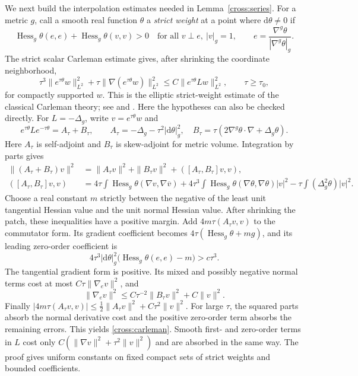 \documentclass[11pt]{article}
\theoremstyle{definition}
\theoremstyle{remark}
\newcommand{\dd}{\mathrm d}
\numberwithin{equation}{section}
\begin{document}
We next build the interpolation estimates needed in
Lemma~\ref{cross:series}.  For a metric $g$, call a smooth real function
$\theta$ a \emph{strict weight} at a point where $\dd\theta\ne0$ if
\begin{equation}\label{cross:strict-weight}
 \operatorname{Hess}_g\theta(e,e)
  +\operatorname{Hess}_g\theta(v,v)>0
 \quad\text{for all }v\perp e,\ |v|_g=1,
 \qquad e=\frac{\nabla^g\theta}{|\nabla^g\theta|_g}.
\end{equation}
The strict scalar Carleman estimate gives, after shrinking the
coordinate neighborhood,
\begin{equation}\label{cross:carleman}
 \tau^3\|e^{\tau\theta}w\|_{L^2}^2
 +\tau\|\nabla(e^{\tau\theta}w)\|_{L^2}^2
 \le C\|e^{\tau\theta}Lw\|_{L^2}^2,
 \qquad \tau\ge\tau_0,
\end{equation}
for compactly supported $w$.
This is the elliptic strict-weight estimate of the classical
Carleman theory; see \citet[Chapter~XXVIII]{HormanderIV2009} and
\citet[Definition~8.3 and Theorem~9(a)]{KochTataru2005}.
Here the hypotheses can also be checked directly.  For $L=-\Delta_g$,
write $v=e^{\tau\theta}w$ and
\[
 e^{\tau\theta}Le^{-\tau\theta}=A_\tau+B_\tau,\qquad
 A_\tau=-\Delta_g-\tau^2|\dd\theta|_g^2,\quad
 B_\tau=\tau(2\nabla^g\theta\cdot\nabla+\Delta_g\theta).
\]
Here $A_\tau$ is self-adjoint and $B_\tau$ is skew-adjoint for
metric volume.  Integration by parts gives
\begin{align*}
 \|(A_\tau+B_\tau)v\|^2
 &=\|A_\tau v\|^2+\|B_\tau v\|^2
       +([A_\tau,B_\tau]v,v),\\
 ([A_\tau,B_\tau]v,v)
 &=4\tau\int\operatorname{Hess}_g\theta(\nabla v,\nabla\overline v)
   +4\tau^3\int\operatorname{Hess}_g\theta
                 (\nabla\theta,\nabla\theta)|v|^2
   -\tau\int(\Delta_g^2\theta)|v|^2.
\end{align*}
Choose a real constant $m$ strictly between the negative of the least
unit tangential Hessian value and the unit normal Hessian value.
After shrinking the patch, these inequalities have a positive margin.
Add $4m\tau(A_\tau v,v)$ to the commutator form.  Its gradient
coefficient becomes $4\tau(\operatorname{Hess}_g\theta+mg)$,
and its leading zero-order coefficient is
\[
 4\tau^3|\dd\theta|_g^2
       \big(\operatorname{Hess}_g\theta(e,e)-m\big)>c\tau^3.
\]
The tangential gradient form is positive.  Its mixed and possibly
negative normal terms cost at most
$C\tau\|\nabla_e v\|^2$, and
\[
 \|\nabla_e v\|^2
 \le C\tau^{-2}\|B_\tau v\|^2+C\|v\|^2.
\]
Finally
$|4m\tau(A_\tau v,v)|\le\tfrac12\|A_\tau v\|^2+
C\tau^2\|v\|^2$.
For large $\tau$, the squared parts absorb the normal derivative
cost and the positive zero-order term absorbs the remaining errors.
This yields \eqref{cross:carleman}.  Smooth first- and zero-order terms
in $L$ cost only $C(\|\nabla v\|^2+\tau^2\|v\|^2)$ and are absorbed
in the same way.  The proof gives uniform constants on fixed compact
sets of strict weights and bounded coefficients.
\end{document}
